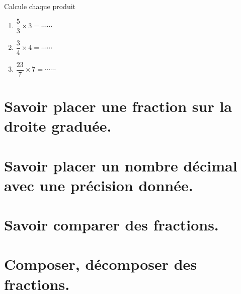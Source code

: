 
Calcule chaque produit
\begin{enumerate}
\item $\dfrac{5}{3} \times 3 = \cdots\cdots $
\item $\dfrac{3}{4} \times 4 = \cdots\cdots $
\item $\dfrac{23}{7} \times 7 = \cdots\cdots $
\end{enumerate}



\section{Savoir placer une fraction sur la droite graduée.}





\section{Savoir placer un nombre décimal avec une précision donnée.}



\section{Savoir comparer des fractions.}



\section{Composer, décomposer des fractions.}


